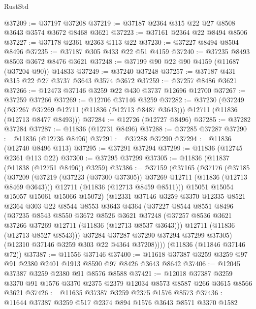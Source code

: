 \begin{lexlean}{RustStd}
\begin{coremodule}
@37209 := @37197 @37208
@37219 := @37187 @2364 @315 @22 @27 @8508 @3643 @3574 @3672 @8468 @3621
@37223 := @37161 @2364 @22 @8494 @8506
@37227 := @37178 @2361 @2363 @113 @22
@37230 := @37227 @8494 @8504 @8496
@37235 := @37187 @305 @433 @22 @51 @4159
@37240 := @37235 @8493 @8503 @3672 @8476 @3621
@37248 := @37199 @90 @22 @90 @4159 (@11687 (@37204 @90)) @14833
@37249 := @37240 @37248
@37257 := @37187 @431 @315 @22 @27 @3737 @3643 @3574 @3672
@37259 := @37257 @8486 @3621
@37266 := @12473 @37146 @3259 @22 @430 @3737 @12696 @12700
@37267 := @37259 @37266
@37269 := @12706 @37146 @3259
@37282 := @37230
    (@37249
      (@37267 @37269 @12711 (@11836 (@12713 @8487 @3643)))
      @12711
      (@11836 (@12713 @8477 @8493)))
@37284 := @12726 (@12727 @8496)
@37285 := @37282 @37284
@37287 := @11836 (@12731 @8496)
@37288 := @37285 @37287
@37290 := @11836 (@12736 @8496)
@37291 := @37288 @37290
@37294 := @11836 (@12740 @8496 @113)
@37295 := @37291 @37294
@37299 := @11836 (@12745 @2361 @113 @22)
@37300 := @37295 @37299
@37305 := @11836 (@11837 (@11838 (@12751 @8496)) @3259)
@37386 := @37159
    (@37165
      (@37176
        (@37185
          (@37209
            (@37219 (@37223 (@37300 @37305)) @37269 @12711 (@11836 (@12713 @8469 @3643)))
            @12711
            (@11836 (@12713 @8459 @8511)))
          @15051
          @15054
          @15057
          @15061
          @15066
          @15072)
        (@12331
          @37146
          @3259
          @3370
          @12335
          @8521
          @2364
          @303
          @22
          @8544
          @8553
          @3643
          @4364
          (@37227
            @8544
            @8551
            @8496
            (@37235
              @8543
              @8550
              @3672
              @8526
              @3621
              @37248
              (@37257 @8536 @3621 @37266 @37269 @12711 (@11836 (@12713 @8537 @3643)))
              @12711
              (@11836 (@12713 @8527 @8543)))
            @37284
            @37287
            @37290
            @37294
            @37299
            @37305)
          (@12310 @37146 @3259 @303 @22 @4364 @37208))))
    (@11836 (@11846 @37146 @72))
@37387 := @11556 @37146
@37400 := @11618 @37387 @3259 @3259 @97 @91 @2380 @2401 @1913 @8590 @97 @8426 @3643 @8642
@37406 := @12045 @37387 @3259 @2380 @91 @8576 @8588
@37421 := @12018
    @37387
    @3259
    @3370
    @91
    @1576
    @3370
    @2375
    @2379
    @12034
    @8573
    @8587
    @266
    @3615
    @8566
    @3621
@37426 := @11635 @37387 @3259 @2375 @1576 @8573
@37436 := @11644 @37387 @3259 @517 @2374 @894 @1576 @3643 @8571 @3370 @1582

\end{coremodule}
\end{lexlean}
